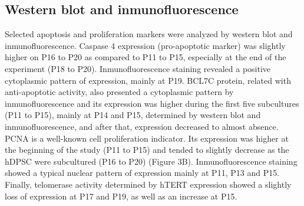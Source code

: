 \documentclass[a4paper,12pt]{article}
\begin{document}
\subsection{Western blot and inmunofluorescence}
Selected apoptosis and proliferation markers were analyzed by western blot and inmunofluorescence. Caspase 4 expression (pro-apoptotic marker) was slightly higher on P16 to P20 as compared to P11 to P15, especially at the end of the experiment (P18 to P20). Inmunofluorescence staining revealed a positive cytoplasmic pattern of expression, mainly at P19. BCL7C protein, related with anti-apoptotic activity, also presented a cytoplasmic pattern by inmunofluorescence and its expression was higher during the first five subcultures (P11 to P15), mainly at P14 and P15, determined by western blot and inmunofluorescence, and after that, expression decreased to almost absence.
PCNA is a well-known cell proliferation indicator. Its expression was higher at the beginning of the study (P11 to P15) and tended to slightly decrease as the hDPSC were subcultured (P16 to P20) (Figure 3B). Inmunofluorescence staining showed a typical nuclear pattern of expression mainly at P11, P13 and P15. Finally, telomerase activity determined by hTERT expression showed a slightly loss of expression at P17 and P19, as well as an increase at P15.

\newpage
\end{document}
